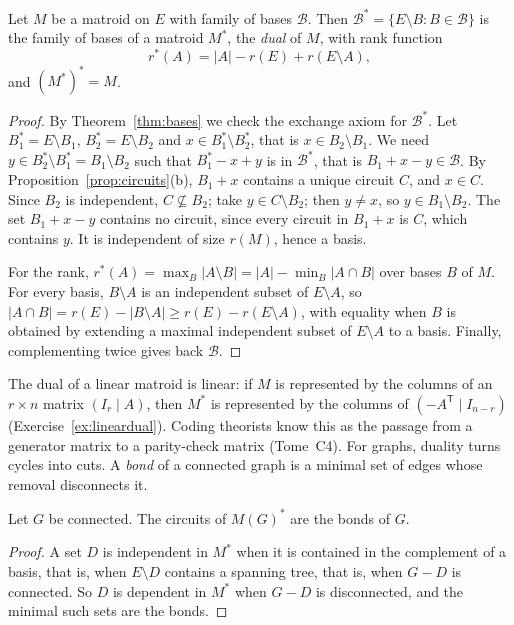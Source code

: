 \begin{theorem}\label{thm:dual}
Let $M$ be a matroid on $E$ with family of bases $\mathcal B$. Then $\mathcal B^*=\{E\setminus B:B\in\mathcal B\}$ is the family of bases of a matroid $M^*$, the \emph{dual} of $M$, with rank function
\[
r^*(A)=|A|-r(E)+r(E\setminus A),
\]
and $(M^*)^*=M$.
\end{theorem}
\begin{proof}
By Theorem~\ref{thm:bases} we check the exchange axiom for $\mathcal B^*$. Let $B_1^*=E\setminus B_1$, $B_2^*=E\setminus B_2$ and $x\in B_1^*\setminus B_2^*$, that is $x\in B_2\setminus B_1$. We need $y\in B_2^*\setminus B_1^*=B_1\setminus B_2$ such that
$B_1^*-x+y$ is in $\mathcal B^*$, that is $B_1+x-y\in\mathcal B$. By Proposition~\ref{prop:circuits}(b), $B_1+x$ contains a unique circuit $C$, and $x\in C$. Since $B_2$ is independent, $C\not\subseteq B_2$; take $y\in C\setminus B_2$;
then $y\ne x$, so $y\in B_1\setminus B_2$. The set $B_1+x-y$ contains no circuit, since every circuit in $B_1+x$ is $C$, which contains $y$. It is independent of size $r(M)$, hence a basis.

For the rank, $r^*(A)=\max_{B}|A\setminus B|=|A|-\min_B|A\cap B|$ over bases $B$ of $M$. For every basis, $B\setminus A$ is an independent subset of $E\setminus A$, so $|A\cap B|=r(E)-|B\setminus A|\ge r(E)-r(E\setminus A)$, with
equality when $B$ is obtained by extending a maximal independent subset of $E\setminus A$ to a basis. Finally, complementing twice gives back $\mathcal B$.
\end{proof}

The dual of a linear matroid is linear: if $M$ is represented by the columns of an $r\times n$ matrix $(I_r\mid A)$, then $M^*$ is represented by the columns of $(-A^{\mathsf T}\mid I_{n-r})$ (Exercise~\ref{ex:lineardual}).
Coding theorists know this as the passage from a generator matrix to a parity-check matrix (Tome~C4). For graphs, duality turns cycles into cuts. A \emph{bond} of a connected graph is a minimal set of edges
whose removal disconnects it.

\begin{proposition}\label{prop:bonds}
Let $G$ be connected. The circuits of $M(G)^*$ are the bonds of $G$.
\end{proposition}
\begin{proof}
A set $D$ is independent in $M^*$ when it is contained in the complement of a basis, that is, when $E\setminus D$ contains a spanning tree, that is, when $G-D$ is connected. So $D$ is dependent in $M^*$ when $G-D$ is disconnected,
and the minimal such sets are the bonds.
\end{proof}

